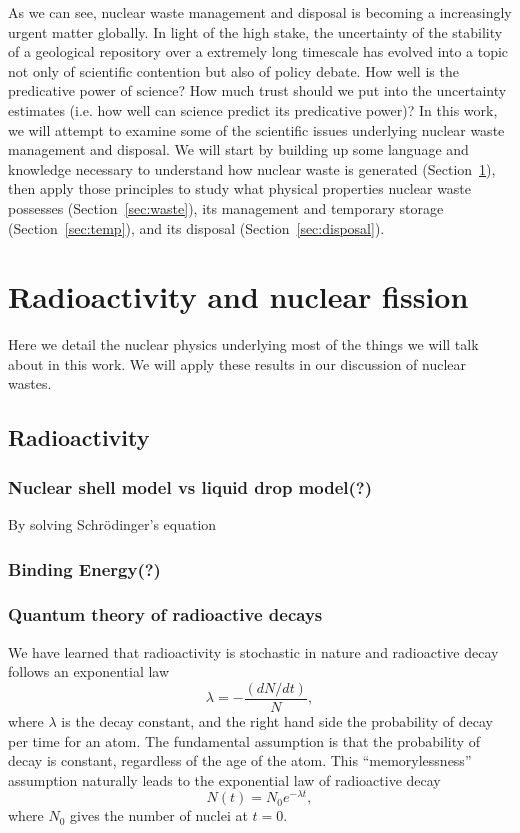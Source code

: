 \documentclass[nofootinbib,preprint,aip,pra]{revtex4-1}
\begin{document}
As we can see, nuclear waste management and disposal is becoming a increasingly urgent matter globally.
In light of the high stake,
the uncertainty of the stability of a geological repository over a extremely long timescale has evolved into 
a topic not only of scientific contention but also of policy debate.
How well is the predicative power of science? How much trust should we put into the uncertainty estimates
(i.e. how well can science predict its predicative power)?
In this work, we will attempt to examine some of the scientific issues underlying nuclear waste management
and disposal. We will start by building up some
language and knowledge necessary to understand how nuclear waste is generated (Section~\ref{sec:phys}),
then apply those principles to study
what physical properties nuclear waste possesses (Section~\ref{sec:waste}), its management and temporary storage
(Section~\ref{sec:temp}), and its disposal (Section~\ref{sec:disposal}).

\section{Radioactivity and nuclear fission}
\label{sec:phys}
    Here we detail the nuclear physics underlying most of the things we will talk about
    in this work. We will apply these results in our discussion of nuclear wastes.
    \subsection{Radioactivity}
    \subsubsection{Nuclear shell model vs liquid drop model(?)}
        By solving Schr\"{o}dinger's equation\cite{k88}
    \subsubsection{Binding Energy(?)}

        \subsubsection{Quantum theory of radioactive decays}
        We have learned that radioactivity is stochastic in nature and radioactive decay follows
        an exponential law
        \begin{equation} \label{eq:exp}
            \lambda = -\frac{(dN/dt)}{N},
        \end{equation}
        where $\lambda$ is the decay constant, and the right hand side the probability of decay
        per time for an atom. The fundamental assumption is that the probability of decay is constant,
        regardless of the age of the atom. This ``memorylessness'' assumption naturally leads to the
        exponential law of radioactive decay
        \begin{equation}
            N(t) = N_0 e^{-\lambda t},
        \end{equation}
        where $N_0$ gives the number of nuclei at $t=0$.
\end{document}
